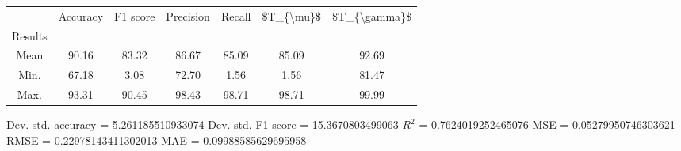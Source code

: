 \begin{tabular}{|c|c|c|c|c|c|c|}
\toprule
{} &  Accuracy &  F1 score &  Precision &  Recall &  \$T\_\{\textbackslash mu\}\$ &  \$T\_\{\textbackslash gamma\}\$ \\
Results &           &           &            &         &            &               \\
\hline
Mean    &     90.16 &     83.32 &      86.67 &   85.09 &      85.09 &         92.69 \\
Min.    &     67.18 &      3.08 &      72.70 &    1.56 &       1.56 &         81.47 \\
Max.    &     93.31 &     90.45 &      98.43 &   98.71 &      98.71 &         99.99 \\
\bottomrule
\end{tabular}

 Dev. std. accuracy = 5.261185510933074
 Dev. std. F1-score = 15.3670803499063
 $R^2$ = 0.7624019252465076
 MSE = 0.05279950746303621
 RMSE = 0.22978143411302013
 MAE = 0.09988585629695958